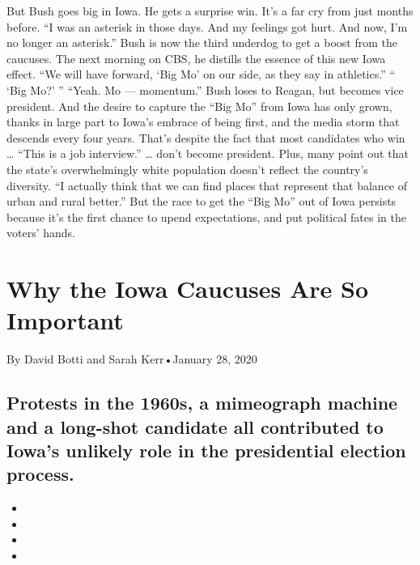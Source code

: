 \begin{itemize}
  But Bush goes big in Iowa. He gets a surprise win. It's a far cry from
  just months before. ``I was an asterisk in those days. And my feelings
  got hurt. And now, I'm no longer an asterisk.'' Bush is now the third
  underdog to get a boost from the caucuses. The next morning on CBS, he
  distills the essence of this new Iowa effect. ``We will have forward,
  `Big Mo' on our side, as they say in athletics.'' `` `Big Mo?' ''
  ``Yeah. Mo --- momentum.'' Bush loses to Reagan, but becomes vice
  president. And the desire to capture the ``Big Mo'' from Iowa has only
  grown, thanks in large part to Iowa's embrace of being first, and the
  media storm that descends every four years. That's despite the fact
  that most candidates who win \ldots{} ``This is a job interview.''
  \ldots{} don't become president. Plus, many point out that the state's
  overwhelmingly white population doesn't reflect the country's
  diversity. ``I actually think that we can find places that represent
  that balance of urban and rural better.'' But the race to get the
  ``Big Mo'' out of Iowa persists because it's the first chance to upend
  expectations, and put political fates in the voters' hands.
\end{itemize}

\hypertarget{why-the-iowa-caucuses-are-so-important-1}{%
\section{Why the Iowa Caucuses Are So
Important}\label{why-the-iowa-caucuses-are-so-important-1}}

By David Botti and Sarah Kerr•January 28, 2020

\hypertarget{protests-in-the-1960s-a-mimeograph-machine-and-a-long-shot-candidate-all-contributed-to-iowas-unlikely-role-in-the-presidential-election-process-1}{%
\subsection{Protests in the 1960s, a mimeograph machine and a long-shot
candidate all contributed to Iowa's unlikely role in the presidential
election
process.}\label{protests-in-the-1960s-a-mimeograph-machine-and-a-long-shot-candidate-all-contributed-to-iowas-unlikely-role-in-the-presidential-election-process-1}}

\begin{itemize}
\item
\item
\item
\item
\end{itemize}


